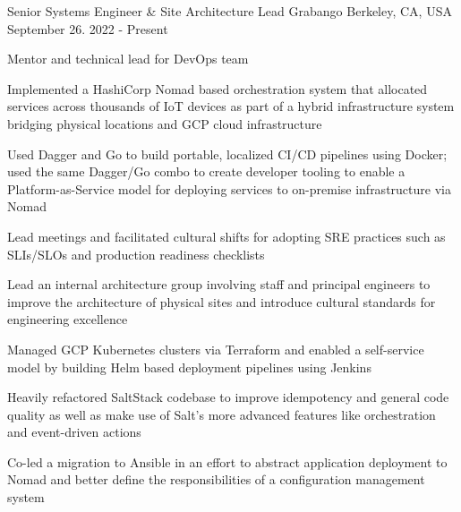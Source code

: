 

\begin{cventries}

  \cventry
    {Senior Systems Engineer \& Site Architecture Lead} %
    {Grabango} %
    {Berkeley, CA, USA} %
    {September 26. 2022 - Present} %
    {
      \begin{cvitems} %
        \item {Mentor and technical lead for DevOps team}
        \item {Implemented a HashiCorp Nomad based orchestration system that allocated services across thousands of IoT devices as part of a hybrid infrastructure system bridging physical locations and GCP cloud infrastructure}
        \item {Used Dagger and Go to build portable, localized CI/CD pipelines using Docker; used the same Dagger/Go combo to create developer tooling to enable a Platform-as-Service model for deploying services to on-premise infrastructure via Nomad}
        \item {Lead meetings and facilitated cultural shifts for adopting SRE practices such as SLIs/SLOs and production readiness checklists}
        \item {Lead an internal architecture group involving staff and principal engineers to improve the architecture of physical sites and introduce cultural standards for engineering excellence}
        \item {Managed GCP Kubernetes clusters via Terraform and enabled a self-service model by building Helm based deployment pipelines using Jenkins}
        \item {Heavily refactored SaltStack codebase to improve idempotency and general code quality as well as make use of Salt's more advanced features like orchestration and event-driven actions}
        \item {Co-led a migration to Ansible in an effort to abstract application deployment to Nomad and better define the responsibilities of a configuration management system}

\end{cvitems}}
\end{cventries}

